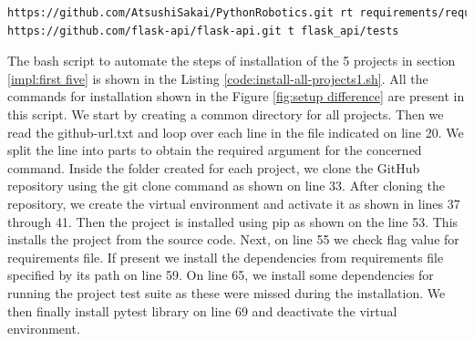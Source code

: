 \lstset{numbers=left, numberstyle=\tiny, stepnumber=1, numbersep=5pt, columns=flexible, breaklines=true}
\lstset{basicstyle=\ttfamily}
\lstset{frame=tb}

\begin{lstlisting}[float,caption=Sample Entry github-url.txt,label=code:github-url-2,language=Bash]
https://github.com/AtsushiSakai/PythonRobotics.git rt requirements/requirements.txt tests
https://github.com/flask-api/flask-api.git t flask_api/tests
\end{lstlisting}

The bash script to automate the steps of installation of the 5 projects in section \ref{impl:first five} is shown in the Listing \ref{code:install-all-projects1.sh}.
All the commands for installation shown in the Figure \ref{fig:setup difference} are present in this script.
We start by creating a common directory for all projects. 
Then we read the github-url.txt and loop over each line in the file indicated on line 20.
We split the line into parts to obtain the required argument for the concerned command.
Inside the folder created for each project, we clone the GitHub repository using the git clone command as shown on line 33.
After cloning the repository, we create the virtual environment and activate it as shown in lines 37 through 41.
Then the project is installed using pip as shown on the line 53.
This installs the project from the source code.
Next, on line 55 we check flag value for requirements file.
If present we install the dependencies from requirements file specified by its path on line 59.
On line 65, we install some dependencies for running the project test suite as these were missed during the installation.
We then finally install pytest library on line 69 and deactivate the virtual environment. 

\lstset{numbers=left, numberstyle=\tiny, stepnumber=1, numbersep=5pt, columns=flexible, breaklines=true, numberblanklines=false}
\lstset{basicstyle=\ttfamily}
\lstset{frame=tb}

